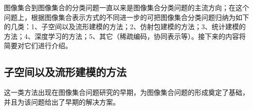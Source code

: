 图像集合到图像集合的分类问题一直以来是图像集合分类问题的主流方向；在这个问题上，根据图像集合表示方式的不同进一步的可把图像集合分类问题归纳为如下的几类：1、子空间以及流形建模的方法\cite{Subspace_MSM,Subspace_GDA,Manifold_MMD,Manifold_MDA}；2、仿射包建模的方法\cite{Affinehull_AF,Affinehull_SANP,Affinehull_RNP,Affinehull_ProNN}；3、统计建模的方法\cite{Statistics_CDL,Statistics_Vemu,Statistics_SPDML,Statistics_LMKML,Statistics_HERML,Statistics_DARG,Statistics_BeyondGauss}；4、深度学习的方法\cite{Deeplearning_MMDML,Deeplearning_DRM}；5、其它（稀疏编码\cite{Collaborative_ISBCOLREP}，协同表示\cite{Dictionary_DBFR}等）。接下来的内容将简要对它们进行介绍。
\subsection{子空间以及流形建模的方法}
\label{sec:current_Subspace_Manifold}
这一类方法出现在图像集合问题研究的早期，为图像集合问题的形成奠定了基础，并且为该问题给出了早期的解决方案。
